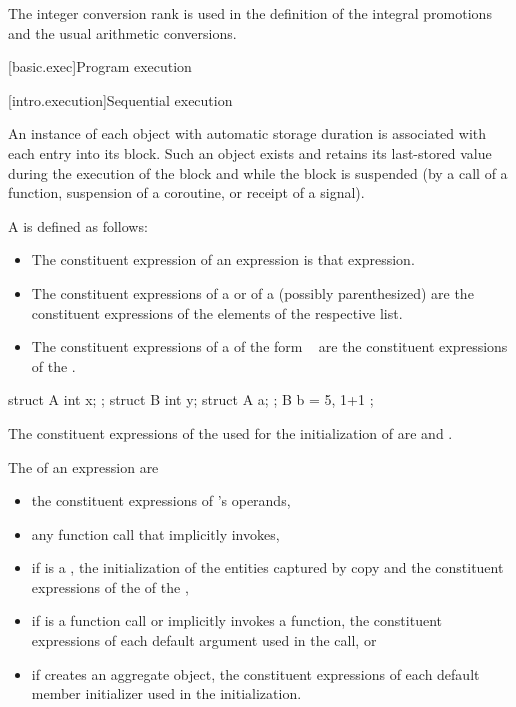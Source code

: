\begin{note}
The integer conversion rank is used in the definition of the integral
promotions and the usual arithmetic
conversions.
\end{note}%

[basic.exec]{Program execution}

[intro.execution]{Sequential execution}

\pnum
An instance of each object with automatic storage
duration is associated with each entry into its
block. Such an object exists and retains its last-stored value during
the execution of the block and while the block is suspended (by a call
of a function, suspension of a coroutine, or receipt of a signal).

\pnum
A  is defined as follows:
\begin{itemize}
\item
The constituent expression of an expression is that expression.
\item
The constituent expressions of a  or
of a (possibly parenthesized) 
are the constituent expressions of the elements of the respective list.
\item
The constituent expressions of a 
of the form \tcode{=}~
are the constituent expressions of the .
\end{itemize}
\begin{example}
\begin{codeblock}
struct A { int x; };
struct B { int y; struct A a; };
B b = { 5, { 1+1 } };
\end{codeblock}
The constituent expressions of the 
used for the initialization of  are  and .
\end{example}

\pnum
The  of an expression  are
\begin{itemize}
\item
the constituent expressions of 's operands,
\item
any function call that  implicitly invokes,
\item
if  is a ,
the initialization of the entities captured by copy and
the constituent expressions of the  of the ,
\item
if  is a function call or implicitly invokes a function,
the constituent expressions of each default argument
used in the call, or
\item
if  creates an aggregate object,
the constituent expressions of each default member initializer
used in the initialization.
\end{itemize}

